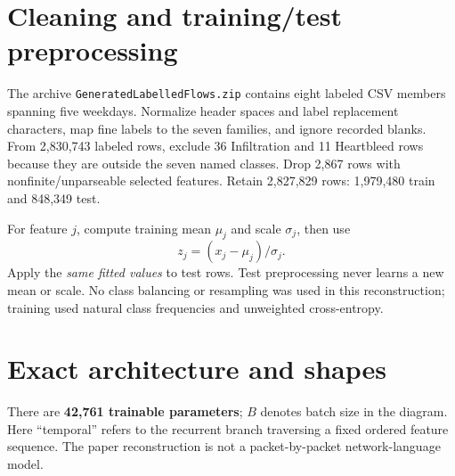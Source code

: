 \documentclass[11pt,a4paper,oneside]{report}
\newcommand{\code}[1]{\nolinkurl{#1}}
\begin{document}
\section{Cleaning and training/test preprocessing}
The archive \code{GeneratedLabelledFlows.zip} contains eight labeled CSV members spanning five weekdays. Normalize header spaces and label replacement characters, map fine labels to the seven families, and ignore recorded blanks. From 2,830,743 labeled rows, exclude 36 Infiltration and 11 Heartbleed rows because they are outside the seven named classes. Drop 2,867 rows with nonfinite/unparseable selected features. Retain 2,827,829 rows: 1,979,480 train and 848,349 test.

For feature $j$, compute training mean $\mu_j$ and scale $\sigma_j$, then use
\[z_j=(x_j-\mu_j)/\sigma_j.\]
Apply the \emph{same fitted values} to test rows. Test preprocessing never learns a new mean or scale. No class balancing or resampling was used in this reconstruction; training used natural class frequencies and unweighted cross-entropy.

\section{Exact architecture and shapes}
\begin{center}
\end{center}
There are \textbf{42,761 trainable parameters}; $B$ denotes batch size in the diagram. Here ``temporal'' refers to the recurrent branch traversing a fixed ordered feature sequence. The paper reconstruction is not a packet-by-packet network-language model.
\end{document}
